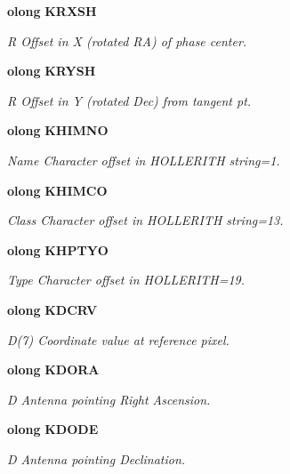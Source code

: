 \begin{CompactItemize}
{\bf olong} {\bf KRXSH}
\begin{CompactList}\small\item\em R Offset in X (rotated RA) of phase center. \item\end{CompactList}\item 
{\bf olong} {\bf KRYSH}
\begin{CompactList}\small\item\em R Offset in Y (rotated Dec) from tangent pt. \item\end{CompactList}\item 
{\bf olong} {\bf KHIMNO}
\begin{CompactList}\small\item\em Name Character offset in HOLLERITH string=1. \item\end{CompactList}\item 
{\bf olong} {\bf KHIMCO}
\begin{CompactList}\small\item\em Class Character offset in HOLLERITH string=13. \item\end{CompactList}\item 
{\bf olong} {\bf KHPTYO}
\begin{CompactList}\small\item\em Type Character offset in HOLLERITH=19. \item\end{CompactList}\item 
{\bf olong} {\bf KDCRV}
\begin{CompactList}\small\item\em D(7) Coordinate value at reference pixel. \item\end{CompactList}\item 
{\bf olong} {\bf KDORA}
\begin{CompactList}\small\item\em D Antenna pointing Right Ascension. \item\end{CompactList}\item 
{\bf olong} {\bf KDODE}
\begin{CompactList}\small\item\em D Antenna pointing Declination. \item\end{CompactList}\item 

\end{CompactItemize}
